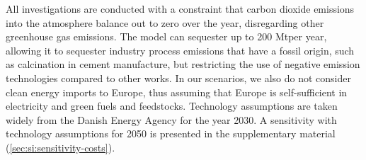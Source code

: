 All investigations are conducted with a constraint that carbon dioxide emissions
into the atmosphere balance out to zero over the year, disregarding other
greenhouse gas emissions. The model can sequester up to 200 Mt\co per year,
allowing it to sequester industry process emissions that have a fossil origin,
such as calcination in cement manufacture, but restricting the use of negative
emission technologies compared to other works.
\cite{blancoPotentialHydrogen2018} In our scenarios, we also do not consider
clean energy imports to Europe, thus assuming that Europe is self-sufficient in
electricity and green fuels and feedstocks. Technology assumptions are taken
widely from the Danish Energy Agency for the year 2030.\cite{DEA} A sensitivity
with technology assumptions for 2050 is presented in the supplementary material
(\cref{sec:si:sensitivity-costs}).

